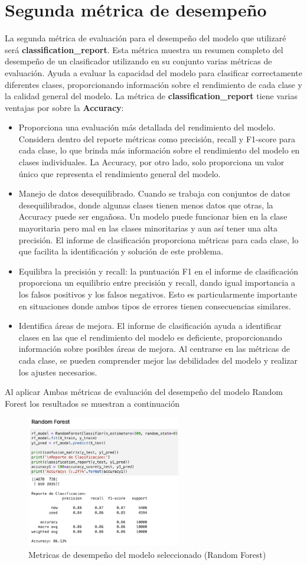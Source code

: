 \documentclass[a4paper,10pt]{article}
\begin{document}
\section*{Segunda métrica de desempeño}
La segunda métrica de evaluación para el desempeño del modelo que utilizaré será \textbf{classification\_report}. 
Esta métrica muestra un resumen completo del desempeño de un clasificador utilizando en su conjunto varias métricas de evaluación. 
Ayuda a evaluar la capacidad del modelo para clasificar correctamente diferentes clases, proporcionando información sobre el rendimiento de cada clase y la calidad general del modelo.
La métrica de \textbf{classification\_report} tiene varias ventajas por sobre la \textbf{Accuracy}:
\begin{itemize}
\item Proporciona una evaluación más detallada del rendimiento del modelo. Considera dentro del reporte métricas como precisión, recall y F1-score para cada clase, 
      lo que brinda más información sobre el rendimiento del modelo en clases individuales. La Accuracy, por otro lado, solo proporciona un valor único que 
      representa el rendimiento general del modelo.
\item Manejo de datos desequilibrado. Cuando se trabaja con conjuntos de datos desequilibrados, donde algunas clases tienen menos datos
      que otras, la Accuracy puede ser engañosa. Un modelo puede funcionar bien en la clase mayoritaria pero mal en las clases minoritarias y aun así tener una 
      alta precisión. El informe de clasificación proporciona métricas para cada clase, lo que facilita la identificación y solución de este problema.
\item Equilibra la precisión y recall: la puntuación F1 en el informe de clasificación proporciona un equilibrio entre precisión y recall, dando igual 
      importancia a los falsos positivos y los falsos negativos. Esto es particularmente importante en situaciones donde ambos tipos de errores tienen consecuencias 
      similares. 
\item Identifica áreas de mejora. El informe de clasificación ayuda a identificar clases en las que el rendimiento del modelo es deficiente, proporcionando 
      información sobre posibles áreas de mejora. Al centrarse en las métricas de cada clase, se pueden comprender mejor las debilidades del 
      modelo y realizar los ajustes necesarios.
\end{itemize}
Al aplicar Ambas métricas de evaluación del desempeño del modelo Random Forest los resultados se muestran a continuación
\begin{figure}[htb]
    \centering
    \includegraphics[width=0.6\textwidth]{./pictures/model_result.png}
    \caption{Metricas de desempeño del modelo seleccionado (Random Forest)} \label{best_model}
    \end{figure}  
\end{document}
